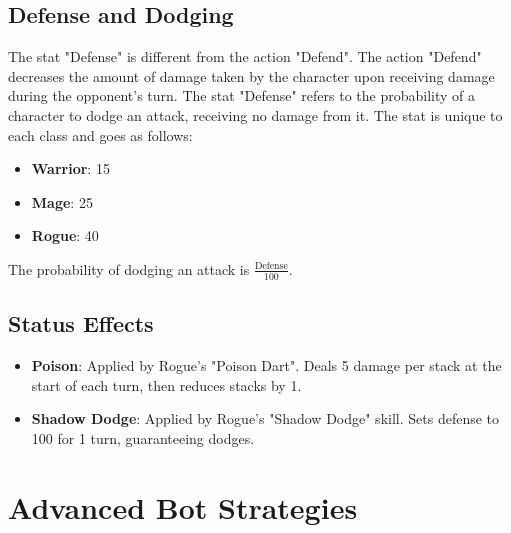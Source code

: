 \documentclass[12pt]{article}
\begin{document}
\subsection{Defense and Dodging}
The stat "Defense" is different from the action "Defend". The action "Defend" decreases the amount of damage taken by the character upon receiving damage during the opponent's turn. The stat "Defense" refers to the probability of a character to dodge an attack, receiving no damage from it. The stat is unique to each class and goes as follows:
\begin{itemize}
    \item \textbf{Warrior}: 15
    \item \textbf{Mage}: 25
    \item \textbf{Rogue}: 40
\end{itemize}
The probability of dodging an attack is $\frac{\text{Defense}}{100}$.

\subsection{Status Effects}
\begin{itemize}
    \item \textbf{Poison}: Applied by Rogue's "Poison Dart". Deals 5 damage per stack at the start of each turn, then reduces stacks by 1.
    \item \textbf{Shadow Dodge}: Applied by Rogue's "Shadow Dodge" skill. Sets defense to 100 for 1 turn, guaranteeing dodges.
\end{itemize}

\section{Advanced Bot Strategies}
\label{sec:advanced}
\end{document}
